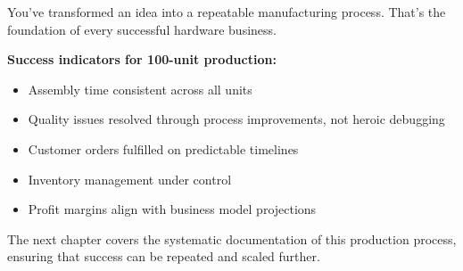 You've transformed an idea into a repeatable manufacturing process. That's the foundation of every successful hardware business.

\textbf{Success indicators for 100-unit production:}
\begin{itemize}
\item Assembly time consistent across all units
\item Quality issues resolved through process improvements, not heroic debugging
\item Customer orders fulfilled on predictable timelines
\item Inventory management under control
\item Profit margins align with business model projections
\end{itemize}

The next chapter covers the systematic documentation of this production process, ensuring that success can be repeated and scaled further.
